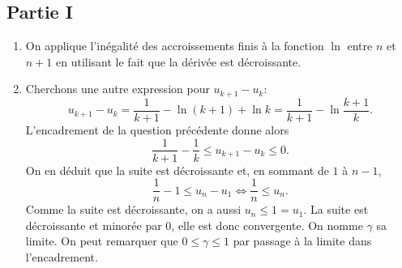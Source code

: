 \subsection*{Partie I}
\begin{enumerate}
 \item On applique l'inégalité des accroissements finis à la fonction $\ln$ entre $n$ et $n+1$ en utilisant le fait que la dérivée est décroissante.
\item Cherchons une autre expression pour $u_{k+1}-u_k$:
\begin{displaymath}
 u_{k+1} - u_k = \frac{1}{k+1} - \ln(k+1) + \ln k = \frac{1}{k+1} - \ln\frac{k+1}{k}. 
\end{displaymath}
L'encadrement de la question précédente donne alors
\begin{displaymath}
  \frac{1}{k+1} -\frac{1}{k} \leq u_{k+1} - u_k \leq 0.
\end{displaymath}
On en déduit que la suite est décroissante et, en sommant de $1$ à $n-1$,
\[
 \frac{1}{n} - 1 \leq u_n - u_1 \Leftrightarrow \frac{1}{n} \leq u_n.
\]
Comme la suite est décroissante, on a aussi $u_n \leq 1 = u_1$.\newline
La suite est décroissante et minorée par $0$, elle est donc convergente. On nomme $\gamma$ sa limite. On peut remarquer que $0 \leq \gamma \leq 1$ par passage à la limite dans l'encadrement.


\end{enumerate}
